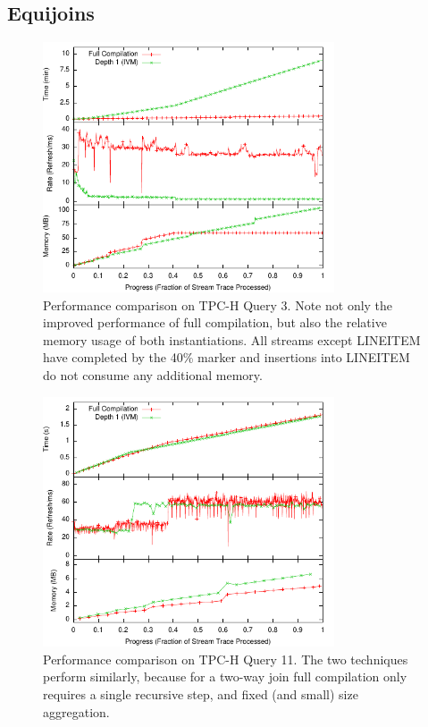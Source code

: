 \subsection{Equijoins}

\begin{figure}
\begin{center}
\includegraphics[width=3.4in]{../graphs/graphs/unified_tpch3.pdf}
\caption{Performance comparison on TPC-H Query 3.  Note not only the improved performance of full compilation, but also the relative memory usage of both instantiations.  All streams except LINEITEM have completed by the 40\% marker and insertions into LINEITEM do not consume any additional memory.}
\label{fig:experiments:tpch3}
\end{center}
\end{figure}

\begin{figure}
\begin{center}
\includegraphics[width=3.4in]{../graphs/graphs/unified_tpch11.pdf}
\caption{Performance comparison on TPC-H Query 11.  The two techniques perform similarly, because for a two-way join full compilation only requires a single recursive step, and fixed (and small) size aggregation.}
\label{fig:experiments:tpch11}
\end{center}
\end{figure}

